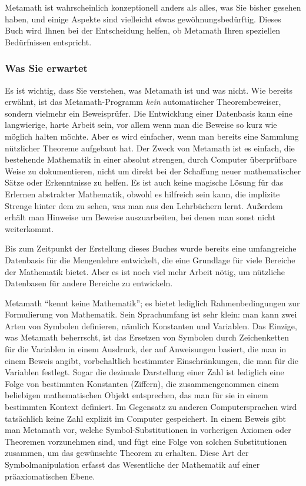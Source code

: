 Metamath ist wahrscheinlich konzeptionell anders als alles, was Sie bisher gesehen haben, und einige Aspekte sind vielleicht etwas gewöhnungsbedürftig. Dieses Buch wird Ihnen bei der Entscheidung helfen, ob Metamath Ihren speziellen Bedürfnissen entspricht.


\subsubsection{Was Sie erwartet}

Es ist wichtig, dass Sie verstehen, was Metamath ist und was nicht. Wie bereits erwähnt, ist das Metamath-Programm {\em kein} automatischer Theorembeweiser, sondern vielmehr ein Beweisprüfer. Die Entwicklung einer Datenbasis kann eine langwierige, harte Arbeit sein, vor allem wenn man die Beweise so kurz wie möglich halten möchte. Aber es wird einfacher, wenn man bereits eine Sammlung nützlicher Theoreme aufgebaut hat. Der Zweck von Metamath ist es einfach, die bestehende Mathematik in einer absolut strengen, durch Computer überprüfbare Weise zu dokumentieren, nicht um direkt bei der Schaffung neuer mathematischer Sätze oder Erkenntnisse zu helfen.  Es ist auch keine magische Lösung für das Erlernen abstrakter Mathematik, obwohl es hilfreich sein kann, die implizite Strenge hinter dem zu sehen, was man aus den Lehrbüchern lernt. Außerdem erhält man Hinweise um Beweise auszuarbeiten, bei denen man sonst nicht weiterkommt.

Bis zum Zeitpunkt der Erstellung dieses Buches wurde bereits eine umfangreiche Datenbasis für die Mengenlehre entwickelt, die eine Grundlage für viele Bereiche der Mathematik bietet. Aber es ist noch viel mehr Arbeit nötig, um nützliche Datenbasen für andere Bereiche zu entwickeln.

Metamath "`kennt keine Mathematik"'; es bietet lediglich Rahmenbedingungen zur Formulierung von Mathematik. Sein Sprachumfang ist sehr klein: man kann zwei Arten von Symbolen definieren, nämlich Konstanten und Variablen.
Das Einzige, was Metamath beherrscht, ist das Ersetzen von Symbolen durch Zeichenketten für die Variablen in einem Ausdruck, der auf Anweisungen basiert, die man in einem Beweis angibt, vorbehaltlich bestimmter Einschränkungen, die man für die Variablen festlegt.  Sogar die dezimale Darstellung einer Zahl ist lediglich eine Folge von bestimmten Konstanten (Ziffern), die zusammengenommen einem beliebigen mathematischen Objekt entsprechen, das man für sie in einem bestimmten Kontext definiert. Im Gegensatz zu anderen Computersprachen wird tatsächlich keine Zahl explizit im Computer gespeichert.
In einem Beweis gibt man Metamath vor, welche Symbol-Substitutionen in vorherigen Axiomen oder Theoremen vorzunehmen sind, und fügt eine Folge von solchen Substitutionen zusammen, um das gewünschte Theorem zu erhalten.  Diese Art der Symbolmanipulation erfasst das Wesentliche der Mathematik auf einer präaxiomatischen Ebene.


